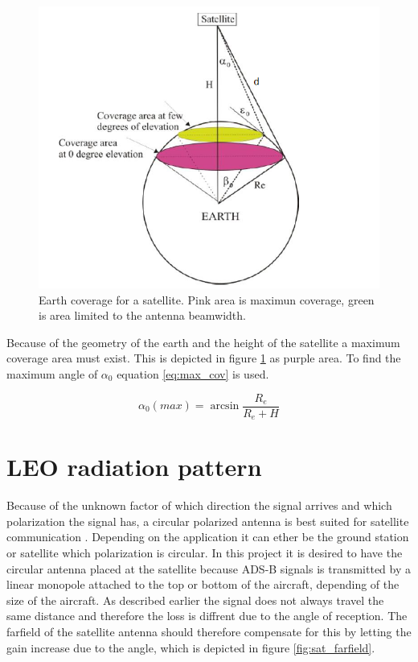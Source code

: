 \begin{figure}[H]
\centering 
\includegraphics[scale = 0.7]{figures/linkbudget/sat_coverage.png}
\caption{Earth coverage for a satellite. Pink area is maximun coverage, green is area limited to the antenna beamwidth. \citep{Cakaj2014}}
\label{fig:cov_sat}
\end{figure} 

Because of the geometry of the earth and the height of the satellite a maximum coverage area must exist. This is depicted in figure \ref{fig:cov_sat} as purple area. To find the maximum angle of $\alpha_0$ equation \ref{eq:max_cov} is used. 

\begin{equation}\label{eq:max_cov}
\alpha_0(max) = \arcsin{\frac{R_e}{R_e+H}}
\end{equation}
 

\section{LEO radiation pattern}
Because of the unknown factor of which direction the signal arrives and which polarization the signal has, a circular polarized antenna is best suited for satellite communication \citep{Balanis2005}. Depending on the application it can ether be the ground station or satellite which polarization is circular. In this project it is desired to have the circular antenna placed at the satellite because ADS-B signals is transmitted by a linear monopole \citep{itu2017} attached to the top or bottom of the aircraft, depending of the size of the aircraft. As described earlier the signal does not always travel the same distance and therefore the loss is diffrent due to the angle of reception. The farfield of the satellite antenna should therefore compensate for this by letting the gain increase due to the angle, which is depicted in figure \ref{fig:sat_farfield}.   

